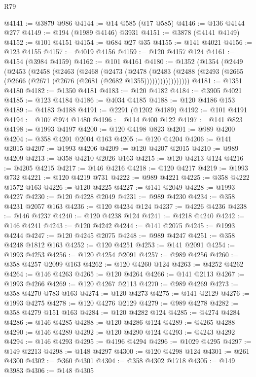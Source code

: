 \begin{lexlean}{R79}
\begin{coremodule}
@4141 := @3879 @986
@4144 := @14 @585 (@17 @585)
@4146 := @136 @4144 @277
@4149 := @194 (@1989 @4146) @3931
@4151 := @3878 (@4141 @4149)
@4152 := @101 @4151
@4154 := @684 @27 @35
@4155 := @141 @4021
@4156 := @123 @4155
@4157 := @4019 @4156
@4159 := @120 @4157 @124
@4161 := @4154 (@3984 @4159)
@4162 := @101 @4161
@4180 := @1352
    (@1354
      (@2449
        (@2453
          (@2458
            (@2463
              (@2468
                (@2473
                  (@2478
                    (@2483
                      (@2488 (@2493 (@2665 (@2666 (@2671 (@2676 (@2681 (@2682 @1355)))))))))))))))))
@4181 := @1351 @4180
@4182 := @1350 @4181
@4183 := @120 @4182
@4184 := @3905 @4021
@4185 := @123 @4184
@4186 := @4034 @4185
@4188 := @120 @4186 @153
@4189 := @4183 @4188
@4191 := @2291 (@1202 @4189)
@4192 := @101 @4191
@4194 := @107 @974 @1480
@4196 := @114 @400 @122
@4197 := @141 @823
@4198 := @1993 @4197
@4200 := @120 @4198 @823
@4201 := @989 @4200
@4204 := @358 @4201 @2004 @163
@4205 := @120 @4204
@4206 := @141 @2015
@4207 := @1993 @4206
@4209 := @120 @4207 @2015
@4210 := @989 @4209
@4213 := @358 @4210 @2026 @163
@4215 := @120 @4213 @124
@4216 := @4205 @4215
@4217 := @146 @4216
@4218 := @120 @4217
@4219 := @1993 @732
@4221 := @120 @4219 @731
@4222 := @989 @4221
@4225 := @358 @4222 @1572 @163
@4226 := @120 @4225
@4227 := @141 @2049
@4228 := @1993 @4227
@4230 := @120 @4228 @2049
@4231 := @989 @4230
@4234 := @358 @4231 @2057 @163
@4236 := @120 @4234 @124
@4237 := @4226 @4236
@4238 := @146 @4237
@4240 := @120 @4238 @124
@4241 := @4218 @4240
@4242 := @146 @4241
@4243 := @120 @4242
@4244 := @141 @2075
@4245 := @1993 @4244
@4247 := @120 @4245 @2075
@4248 := @989 @4247
@4251 := @358 @4248 @1812 @163
@4252 := @120 @4251
@4253 := @141 @2091
@4254 := @1993 @4253
@4256 := @120 @4254 @2091
@4257 := @989 @4256
@4260 := @358 @4257 @2099 @163
@4262 := @120 @4260 @124
@4263 := @4252 @4262
@4264 := @146 @4263
@4265 := @120 @4264
@4266 := @141 @2113
@4267 := @1993 @4266
@4269 := @120 @4267 @2113
@4270 := @989 @4269
@4273 := @358 @4270 @783 @163
@4274 := @120 @4273
@4275 := @141 @2129
@4276 := @1993 @4275
@4278 := @120 @4276 @2129
@4279 := @989 @4278
@4282 := @358 @4279 @151 @163
@4284 := @120 @4282 @124
@4285 := @4274 @4284
@4286 := @146 @4285
@4288 := @120 @4286 @124
@4289 := @4265 @4288
@4290 := @146 @4289
@4292 := @120 @4290 @124
@4293 := @4243 @4292
@4294 := @146 @4293
@4295 := @4196 @4294
@4296 := @1029 @4295
@4297 := @149 @2213
@4298 := @148 @4297
@4300 := @120 @4298 @124
@4301 := @261 @4300
@4302 := @360 @4301
@4304 := @358 @4302 @1718
@4305 := @149 @3983
@4306 := @148 @4305

\end{coremodule}
\end{lexlean}

